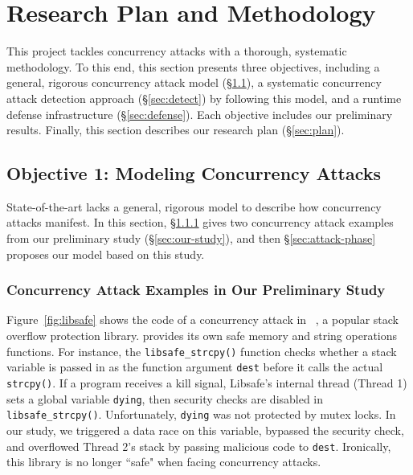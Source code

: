 \vspace{-.15in}\section{Research Plan and Methodology}
\label{sec:rep}\vspace{-.075in}

This \xxx project tackles concurrency attacks with a thorough, systematic 
methodology. To this end, this section presents three objectives, including a 
general, rigorous concurrency attack model (\S\ref{sec:model}), a systematic 
concurrency attack detection approach (\S\ref{sec:detect}) by following this 
model, and a runtime defense infrastructure (\S\ref{sec:defense}). Each 
objective includes our preliminary results. Finally, this section describes our 
research plan (\S\ref{sec:plan}).

\vspace{-.15in}\subsection{Objective 1: Modeling Concurrency Attacks} 
\label{sec:model}\vspace{-.075in}

State-of-the-art lacks a general, rigorous model to describe how concurrency 
attacks manifest. In this section, \S\ref{sec:examples} gives two concurrency 
attack examples from our preliminary study (\S\ref{sec:our-study}), and then 
\S\ref{sec:attack-phase} proposes our model based on this study.

\vspace{-.15in}\subsubsection{Concurrency Attack Examples in Our Preliminary 
Study} 
\label{sec:examples}\vspace{-.075in}

Figure~\ref{fig:libsafe} shows the code of a concurrency attack in 
\libsafe~\cite{libsafe}, a popular stack overflow protection library. \libsafe
provides its own safe memory and string operations functions. For instance, the 
\texttt{libsafe\_strcpy()} function checks whether a stack variable is passed 
in as the function argument \texttt{dest} before it calls the actual 
\texttt{strcpy()}. If a program receives a kill signal, Libsafe's internal 
thread (Thread 1) sets a global variable \texttt{dying}, then security checks 
are disabled in \texttt{libsafe\_strcpy()}. Unfortunately, \texttt{dying} was 
not protected by mutex locks. In our study, we triggered a data race on this 
variable, bypassed the security check, and overflowed Thread 2's stack by 
passing malicious code to \texttt{dest}. Ironically, this \libsafe library is 
no longer ``safe" when facing concurrency attacks.

